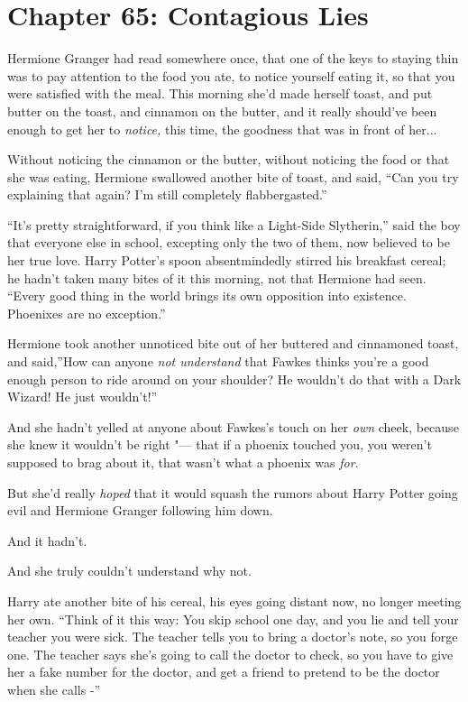 \chapter{Chapter 65: Contagious Lies}
Hermione Granger had read somewhere once, that one of the keys to
staying thin was to pay attention to the food you ate, to notice
yourself eating it, so that you were satisfied with the meal. This
morning she'd made herself toast, and put butter on the toast, and
cinnamon on the butter, and it really should've been enough to get her
to \emph{notice,} this time, the goodness that was in front of
her...

Without noticing the cinnamon or the butter, without noticing the food
or that she was eating, Hermione swallowed another bite of toast, and
said, ``Can you try explaining that again? I'm still completely
flabbergasted.''

``It's pretty straightforward, if you think like a Light-Side
Slytherin,'' said the boy that everyone else in school, excepting only
the two of them, now believed to be her true love. Harry Potter's spoon
absentmindedly stirred his breakfast cereal; he hadn't taken many bites
of it this morning, not that Hermione had seen. ``Every good thing in
the world brings its own opposition into existence. Phoenixes are no
exception.''

Hermione took another unnoticed bite out of her buttered and cinnamoned
toast, and said,''How can anyone \emph{not understand} that Fawkes
thinks you're a good enough person to ride around on your shoulder? He
wouldn't do that with a Dark Wizard! He just wouldn't!''

And she hadn't yelled at anyone about Fawkes's touch on her \emph{own}
cheek, because she knew it wouldn't be right "--- that if a phoenix touched
you, you weren't supposed to brag about it, that wasn't what a phoenix
was \emph{for}.

But she'd really \emph{hoped} that it would squash the rumors about
Harry Potter going evil and Hermione Granger following him down.

And it hadn't.

And she truly couldn't understand why not.

Harry ate another bite of his cereal, his eyes going distant now, no
longer meeting her own. ``Think of it this way: You skip school one day,
and you lie and tell your teacher you were sick. The teacher tells you
to bring a doctor's note, so you forge one. The teacher says she's going
to call the doctor to check, so you have to give her a fake number for
the doctor, and get a friend to pretend to be the doctor when she calls
-''

